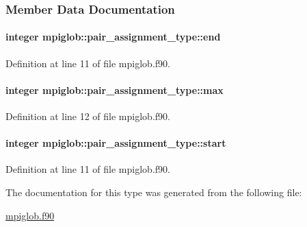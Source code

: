\subsubsection{Member Data Documentation}
\hypertarget{structmpiglob_1_1pair__assignment__type_af63559b30e5a0444b5c0908dcccbd035}{
\paragraph[{end}]{\setlength{\rightskip}{0pt plus 5cm}integer mpiglob\-::pair\-\_\-assignment\-\_\-type\-::end}}\label{structmpiglob_1_1pair__assignment__type_af63559b30e5a0444b5c0908dcccbd035}


Definition at line 11 of file mpiglob.\-f90.

\hypertarget{structmpiglob_1_1pair__assignment__type_ac824ffaaef5ea4e45d4decc25291d0e4}{
\paragraph[{max}]{\setlength{\rightskip}{0pt plus 5cm}integer mpiglob\-::pair\-\_\-assignment\-\_\-type\-::max}}\label{structmpiglob_1_1pair__assignment__type_ac824ffaaef5ea4e45d4decc25291d0e4}


Definition at line 12 of file mpiglob.\-f90.

\hypertarget{structmpiglob_1_1pair__assignment__type_a89cf6316a4b25d1a85ee34cc9c9ddc17}{
\paragraph[{start}]{\setlength{\rightskip}{0pt plus 5cm}integer mpiglob\-::pair\-\_\-assignment\-\_\-type\-::start}}\label{structmpiglob_1_1pair__assignment__type_a89cf6316a4b25d1a85ee34cc9c9ddc17}


Definition at line 11 of file mpiglob.\-f90.



The documentation for this type was generated from the following file\-:\begin{DoxyCompactItemize}
\item 
\hyperlink{mpiglob_8f90}{mpiglob.\-f90}\end{DoxyCompactItemize}
